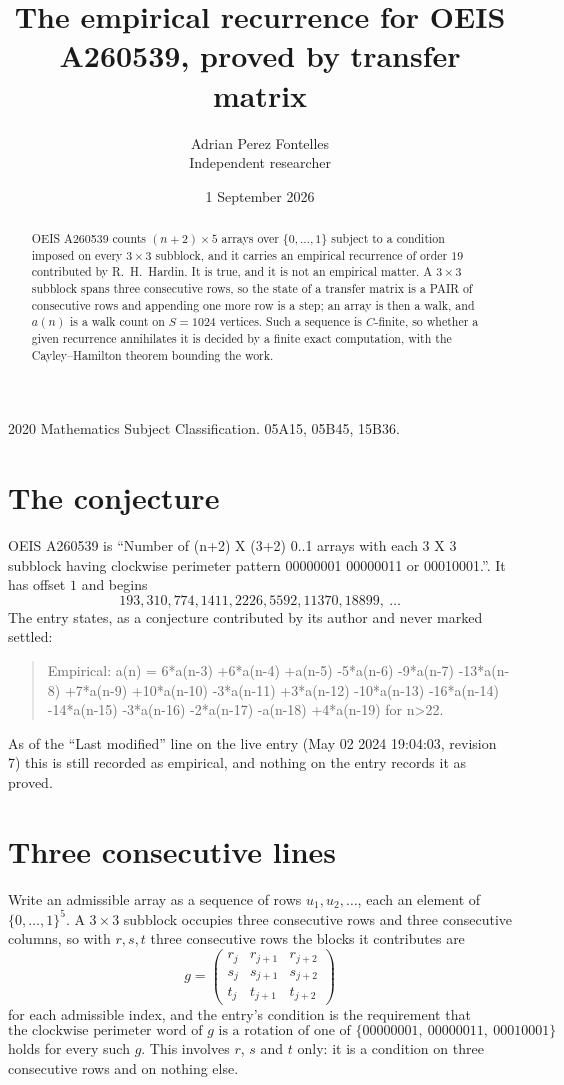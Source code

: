\documentclass[11pt,a4paper]{article}
\title{The empirical recurrence for OEIS A260539, proved by transfer matrix}
\author{Adrian Perez Fontelles\\ \small Independent researcher}
\date{1 September 2026}
\theoremstyle{plain}
\theoremstyle{definition}
\begin{document}
\maketitle

\begin{abstract}
OEIS A260539 counts $(n+2)\times5$ arrays over $\{0,\dots,1\}$ subject to a condition imposed on
every $3\times3$ subblock, and it carries an empirical recurrence of order $19$
contributed by R.~H.~Hardin. It is true, and it is not an empirical matter. A $3\times3$
subblock spans three consecutive rows, so the state of a transfer matrix is a PAIR of
consecutive rows and appending one more row is a step; an array is then a walk, and
$a(n)$ is a walk count on $S=1024$ vertices. Such a sequence is $C$-finite, so whether a given
recurrence annihilates it is decided by a finite exact computation, with the Cayley--Hamilton
theorem bounding the work.
\end{abstract}

\noindent\small 2020 Mathematics Subject Classification. 05A15, 05B45, 15B36.\normalsize

\section{The conjecture}

OEIS A260539 is ``Number of (n+2) X (3+2) 0..1 arrays with each 3 X 3 subblock having clockwise perimeter pattern 00000001 00000011 or 00010001.''. It has offset $1$ and begins
\[
193, 310, 774, 1411, 2226, 5592, 11370, 18899,\ \dots
\]
The entry states, as a conjecture contributed by its author and never marked settled:
\begin{quote}
Empirical: a(n) = 6*a(n-3) +6*a(n-4) +a(n-5) -5*a(n-6) -9*a(n-7) -13*a(n-8) +7*a(n-9) +10*a(n-10) -3*a(n-11) +3*a(n-12) -10*a(n-13) -16*a(n-14) -14*a(n-15) -3*a(n-16) -2*a(n-17) -a(n-18) +4*a(n-19) for n>22.
\end{quote}
As of the ``Last modified'' line on the live entry (May 02 2024 19:04:03, revision 7) this is still
recorded as empirical, and nothing on the entry records it as proved.

\section{Three consecutive lines}

Write an admissible array as a sequence of rows $u_1,u_2,\dots$, each an element of
$\{0,\dots,1\}^{5}$. A $3\times3$ subblock occupies three consecutive rows and
three consecutive columns, so with $r,s,t$ three consecutive rows the blocks it
contributes are
\[
g=\begin{pmatrix}r_j&r_{j+1}&r_{j+2}\\ s_j&s_{j+1}&s_{j+2}\\ t_j&t_{j+1}&t_{j+2}\end{pmatrix}
\]
for each admissible index, and the entry's condition is the requirement that
\[
\text{the clockwise perimeter word of }g\text{ is a rotation of one of }\{00000001,\ 00000011,\ 00010001\}
\]
holds for every such $g$. This involves $r$, $s$ and $t$ only: it is a condition on
three consecutive rows and on nothing else.
\end{document}
